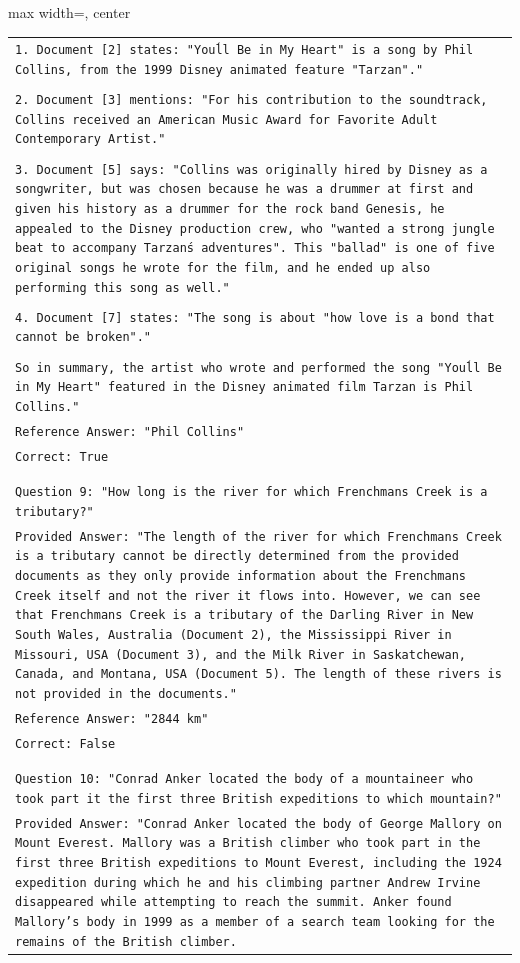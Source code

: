 \documentclass[11pt]{article}
\begin{document}
\begin{table}[ht]
\begin{adjustbox}{max width=\textwidth, center}
\begin{tabular}{>{\raggedright\arraybackslash\tt}p{}<{}}
1. Document [2] states: "You\'ll Be in My Heart" is a song by Phil Collins, from the 1999 Disney animated feature "Tarzan"."\\
\\
2. Document [3] mentions: "For his contribution to the soundtrack, Collins received an American Music Award for Favorite Adult Contemporary Artist."\\
\\
3. Document [5] says: "Collins was originally hired by Disney as a songwriter, but was chosen because he was a drummer at first and given his history as a drummer for the rock band Genesis, he appealed to the Disney production crew, who "wanted a strong jungle beat to accompany Tarzan\'s adventures". This "ballad" is one of five original songs he wrote for the film, and he ended up also performing this song as well."\\
\\
4. Document [7] states: "The song is about "how love is a bond that cannot be broken"."\\
\\
So in summary, the artist who wrote and performed the song "You\'ll Be in My Heart" featured in the Disney animated film Tarzan is Phil Collins."\\
Reference Answer: "Phil Collins"\\
Correct: True\\
\\
\\
Question 9: "How long is the river for which Frenchmans Creek is a tributary?"\\
Provided Answer: "The length of the river for which Frenchmans Creek is a tributary cannot be directly determined from the provided documents as they only provide information about the Frenchmans Creek itself and not the river it flows into. However, we can see that Frenchmans Creek is a tributary of the Darling River in New South Wales, Australia (Document 2), the Mississippi River in Missouri, USA (Document 3), and the Milk River in Saskatchewan, Canada, and Montana, USA (Document 5). The length of these rivers is not provided in the documents."\\
Reference Answer: "2844 km"\\
Correct: False\\
\\
\\
Question 10: "Conrad Anker located the body of a mountaineer who took part it the first three British expeditions to which mountain?"\\
Provided Answer: "Conrad Anker located the body of George Mallory on Mount Everest. Mallory was a British climber who took part in the first three British expeditions to Mount Everest, including the 1924 expedition during which he and his climbing partner Andrew Irvine disappeared while attempting to reach the summit. Anker found Mallory's body in 1999 as a member of a search team looking for the remains of the British climber.


\end{tabular}
\end{adjustbox}
\end{table}
\end{document}
